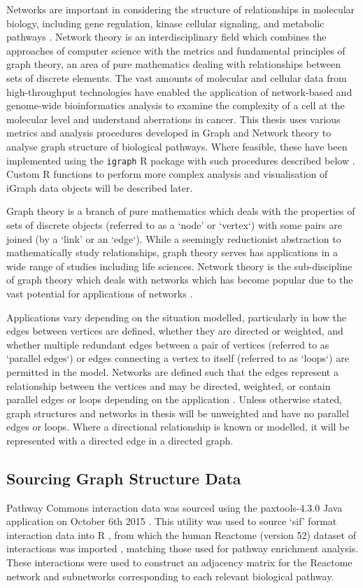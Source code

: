 Networks are important in considering the structure of relationships in molecular biology, including gene regulation, kinase cellular signaling, and metabolic pathways \citep{Barabasi2004}. Network theory is an interdisciplinary field which combines the approaches of computer science with the metrics and fundamental principles of graph theory, an area of pure mathematics dealing with relationships between sets of discrete elements. The vast amounts of molecular and cellular data from high-throughput technologies have enabled the application of network-based and genome-wide bioinformatics analysis to examine the complexity of a cell at the molecular level and understand aberrations in cancer. This thesis uses various metrics and analysis procedures developed in Graph and Network theory to analyse graph structure of biological pathways. Where feasible, these have been implemented using the \texttt{igraph} R package with such procedures described below \citep{igraph}. Custom R functions to perform more complex analysis and visualisation of iGraph data objects will be described later.

Graph theory is a branch of pure mathematics which deals with the properties of sets of discrete objects (referred to as a `node' or `vertex`) with some pairs are joined (by a `link' or an `edge`). While a seemingly reductionist abstraction to mathematically study relationships, graph theory serves has applications in a wide range of studies including life sciences. Network theory is the sub-discipline of graph theory which deals with networks which has become popular due to the vast potential for applications of networks \citep{vanSteen2010}. 

Applications vary depending on the situation modelled, particularly in how the edges between vertices are defined, whether they are directed or weighted, and whether multiple redundant edges between a pair of vertices (referred to as `parallel edges`) or edges connecting a vertex to itself (referred to as `loops`) are permitted in the model. Networks are defined such that the edges represent a relationship between the vertices and may be directed, weighted, or contain parallel edges or loops depending on the application \citep{vanSteen2010}. Unless otherwise stated, graph structures and networks in thesis will be unweighted and have no parallel edges or loops. Where a directional relationship is known or modelled, it will be represented with a directed edge in a directed graph.

\subsection{Sourcing Graph Structure Data} \label{methods:graph_data}
Pathway Commons interaction data was sourced using the paxtools-4.3.0 Java application on October 6th 2015 \citep{PathwayCommons, paxtools}. This utility was used to source `sif' format interaction data into R \citep{R_core}, from which the human Reactome (version 52) dataset of interactions was imported \citep{Reactome}, matching those used for pathway enrichment analysis. These interactions were used to construct an adjacency matrix for the Reactome network and subnetworks corresponding to each relevant biological pathway. 

